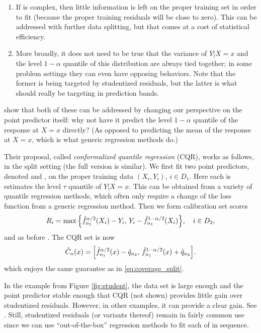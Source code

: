 \documentclass{article}
\begin{document}
\begin{enumerate}
\item If  is complex, then little information is left on the
  proper training set in order to fit  (because the
  proper training residuals will be close to zero). This can be addressed with
  further data splitting, but that comes at a cost of statistical efficiency. 

\item More broadly, it does not need to be true that the variance of $Y|X=x$ and
  the level $1-\alpha$ quantile of this distribution are always tied together;
  in some problem settings they can even have opposing behaviors. Note that the
  former is being targeted by studentized residuals, but the latter is what
  should really be targeting in prediction bands.       
\end{enumerate}

\citet{romano2019conformalized} show that both of these can be addressed by
changing our perspective on the point predictor itself: why not have it predict
the level $1-\alpha$ quantile of the response at $X=x$ directly? (As opposed to
predicting the mean of the response at $X=x$, which is what generic regression
methods do.) 

Their proposal, called \emph{conformalized quantile regression} (CQR), works as
follows, in the split setting (the full version is similar). We first fit two
point predictors, denoted  and
, on the proper training data $(X_i,Y_i)$, $i  
\in D_1$. Here each  is estimates the level $\tau$
quantile of $Y|X=x$. This can be obtained from a variety of quantile regression  
methods, which often only require a change of the loss function from a generic
regression method. Then we form calibration set scores    
\[
R_i = \max\Big\{\hat{f}^{\alpha/2}_{n_1}(X_i) - Y_i, \, 
Y_i - \hat{f}^{1-\alpha/2}_{n_1}(X_i) \Big\}, \quad i \in D_2, 
\]
and as before . The CQR set is now  
\begin{equation}
\label{eq:cset_cqr_split}
\hat{C}_n(x) = \Big[ \hat{f}^{\alpha/2}_{n_1}(x) - \hat{q}_{n_2}, \,
\hat{f}^{1-\alpha/2}_{n_1}(x) + \hat{q}_{n_2} \Big].
\end{equation}
which enjoys the same guarantee as in \eqref{eq:coverage_split}. 

In the example from Figure \ref{fig:student}, the data set is large enough and
the point predictor stable enough that CQR (not shown) provides little gain over
studentized residuals. However, in other examples, it can provide a clear  
gain. See \citet{romano2019conformalized}. Still, studentized residuals (or
variants thereof) remain in fairly common use since we can use
``out-of-the-box'' regression methods to fit each of  in sequence.
\end{document}
